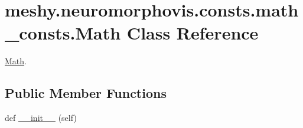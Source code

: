 \hypertarget{classmeshy_1_1neuromorphovis_1_1consts_1_1math__consts_1_1Math}{}\section{meshy.\+neuromorphovis.\+consts.\+math\+\_\+consts.\+Math Class Reference}
\label{classmeshy_1_1neuromorphovis_1_1consts_1_1math__consts_1_1Math}


\hyperlink{classmeshy_1_1neuromorphovis_1_1consts_1_1math__consts_1_1Math}{Math}.  


\subsection*{Public Member Functions}
\begin{DoxyCompactItemize}
\item 
def \hyperlink{classmeshy_1_1neuromorphovis_1_1consts_1_1math__consts_1_1Math_ad16f9cc5a2b94dbe53b2b8df66d61143}{\+\_\+\+\_\+init\+\_\+\+\_\+} (self)\hypertarget{classmeshy_1_1neuromorphovis_1_1consts_1_1math__consts_1_1Math_ad16f9cc5a2b94dbe53b2b8df66d61143}{}\label{classmeshy_1_1neuromorphovis_1_1consts_1_1math__consts_1_1Math_ad16f9cc5a2b94dbe53b2b8df66d61143}

\end{DoxyCompactItemize}
